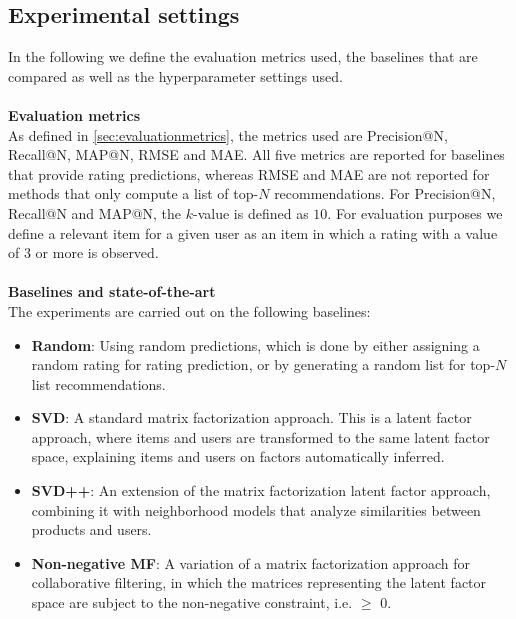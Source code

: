 \subsection{Experimental settings}
In the following we define the evaluation metrics used, the baselines that are compared as well as the hyperparameter settings used.
\\\\
\textbf{Evaluation metrics}\\
As defined in \cref{sec:evaluationmetrics}, the metrics used are Precision@N, Recall@N, MAP@N, RMSE and MAE.
All five metrics are reported for baselines that provide rating predictions, whereas RMSE and MAE are not reported for methods that only compute a list of top-$N$ recommendations.
For Precision@N, Recall@N and MAP@N, the $k$-value is defined as $10$.
For evaluation purposes we define a relevant item for a given user as an item in which a rating with a value of $3$ or more is observed.
\\\\
\textbf{Baselines and state-of-the-art}\\
The experiments are carried out on the following baselines:
\begin{itemize}
    \item \textbf{Random}: Using random predictions, which is done by either assigning a random rating for rating prediction, or by generating a random list for top-$N$ list recommendations.
    \item \textbf{SVD}: A standard matrix factorization approach. This is a latent factor approach, where items and users are transformed to the same latent factor space, explaining items and users on factors automatically inferred.
    \item \textbf{SVD++}: An extension of the matrix factorization latent factor approach, combining it with neighborhood models that analyze similarities between products and users.
    \item \textbf{Non-negative MF}: A variation of a matrix factorization approach for collaborative filtering, in which the matrices representing the latent factor space are subject to the non-negative constraint, i.e. $\geq$ 0.
\end{itemize}

